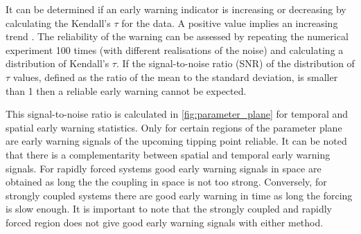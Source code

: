 It can be determined if an early warning indicator is increasing or decreasing by calculating the Kendall's $\tau$ for the data.
A positive value implies an increasing trend \parencite{Wilks2019}. The reliability of the warning can be assessed by repeating the numerical
experiment 100 times (with different realisations of the noise) and calculating a distribution of Kendall's $\tau$. If the signal-to-noise ratio
(SNR) of the distribution of $\tau$ values, defined as the ratio of the mean to the standard deviation, is smaller than 1 then a reliable early warning cannot be expected.

This signal-to-noise ratio is calculated in \cref{fig:parameter_plane} for temporal and spatial early warning statistics. Only for
certain regions of the parameter plane are early warning signals of the upcoming tipping point reliable. It can be noted that there is a complementarity between spatial
and temporal early warning signals. For rapidly forced systems good early warning signals in space are obtained as long the
the coupling in space is not too strong. Conversely, for strongly coupled systems there are good early warning in time as long the forcing is slow enough. It is important to note that
the strongly coupled and rapidly forced region does not give good early warning signals with either method.

